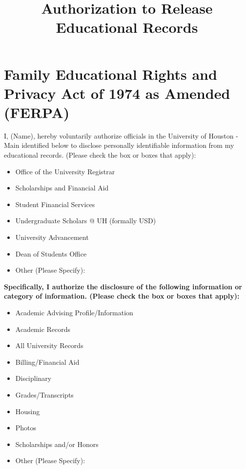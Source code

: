 \documentclass[12pt]{article}
\begin{document}
\title{Authorization to Release Educational Records}
\author{}
\date{}
\maketitle

\section*{Family Educational Rights and Privacy Act of 1974 as Amended (FERPA)}

I, \underline{\hspace{3cm}} \hspace{0.3cm} (Name), hereby voluntarily authorize officials in the University of Houston - Main identified below to disclose personally identifiable information from my educational records. (Please check the box or boxes that apply):

\begin{itemize}
    \item \checkbox{} Office of the University Registrar
    \item \checkbox{} Scholarships and Financial Aid
    \item \checkbox{} Student Financial Services
    \item \checkbox{} Undergraduate Scholars @ UH (formally USD)
    \item \checkbox{} University Advancement
    \item \checkbox{} Dean of Students Office
    \item \checkbox{} Other (Please Specify): \underline{\hspace{3cm}}
\end{itemize}

\textbf{Specifically, I authorize the disclosure of the following information or category of information. (Please check the box or boxes that apply):}

\begin{itemize}
    \item \checkbox{} Academic Advising Profile/Information
    \item \checkbox{} Academic Records
    \item \checkbox{} All University Records
    \item \checkbox{} Billing/Financial Aid
    \item \checkbox{} Disciplinary
    \item \checkbox{} Grades/Transcripts
    \item \checkbox{} Housing
    \item \checkbox{} Photos
    \item \checkbox{} Scholarships and/or Honors
    \item \checkbox{} Other (Please Specify): \underline{\hspace{3cm}}
\end{itemize}
\end{document}
